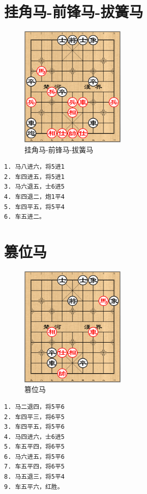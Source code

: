 \documentclass[a5paper,twoside]{book}
\begin{document}
\section{挂角马-前锋马-拔簧马}
\label{sec-6-4}
\begin{figure}[H]
\centering
\includegraphics[width=5cm]{pic/挂角马-前锋马-拔簧马.png}
\caption{挂角马-前锋马-拔簧马}
\end{figure}

\begin{verbatim}
1. 马八进六，将5进1
2. 车四进五，将5进1
3. 马六退五，士6进5
4. 车四退二，炮1平4
5. 车四平五，将5平4
6. 车五进二。
\end{verbatim}

\section{篡位马}
\label{sec-6-5}
\begin{figure}[H]
\centering
\includegraphics[width=5cm]{pic/篡位马.png}
\caption{篡位马}
\end{figure}

\begin{verbatim}
1. 马二退四，将5平6
2. 车四平三，将6平5
3. 车四平五，将5平6
4. 马四进六，士6进5
5. 车五平四，将6平5
6. 马六进五，将5平6
7. 车五平四，将6平5
8. 马五退三，将5平4
9. 车五平六，红胜。
\end{verbatim}
\end{document}
